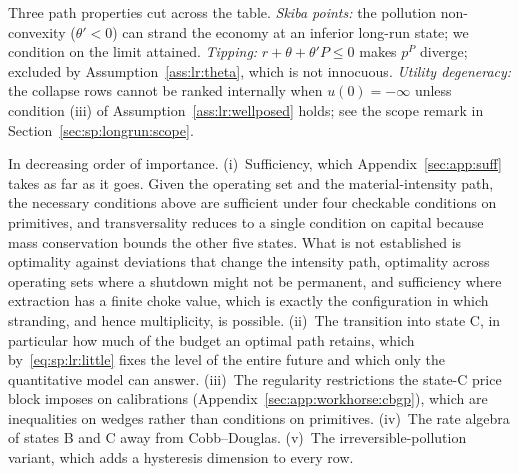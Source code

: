  Three path properties cut across the table. \emph{Skiba points:} the pollution non-convexity ($\theta'<0$) can strand the economy at an inferior long-run state; we condition on the limit attained. \emph{Tipping:} $r+\theta+\theta'P\le0$ makes $p^P$ diverge; excluded by Assumption~\ref{ass:lr:theta}, which is not innocuous. \emph{Utility degeneracy:} the collapse rows cannot be ranked internally when $u\left(0\right)=-\infty$ unless condition (iii) of Assumption~\ref{ass:lr:wellposed} holds; see the scope remark in Section~\ref{sec:sp:longrun:scope}.

 In decreasing order of importance. (i)~Sufficiency, which Appendix~\ref{sec:app:suff} takes as far as it goes. Given the operating set and the material-intensity path, the necessary conditions above are sufficient under four checkable conditions on primitives, and transversality reduces to a single condition on capital because mass conservation bounds the other five states. What is not established is optimality against deviations that change the intensity path, optimality across operating sets where a shutdown might not be permanent, and sufficiency where extraction has a finite choke value, which is exactly the configuration in which stranding, and hence multiplicity, is possible. (ii)~The transition into state C, in particular how much of the budget an optimal path retains, which by~\eqref{eq:sp:lr:little} fixes the level of the entire future and which only the quantitative model can answer. (iii)~The regularity restrictions the state-C price block imposes on calibrations (Appendix~\ref{sec:app:workhorse:cbgp}), which are inequalities on wedges rather than conditions on primitives. (iv)~The rate algebra of states B and C away from Cobb--Douglas. (v)~The irreversible-pollution variant, which adds a hysteresis dimension to every row.
